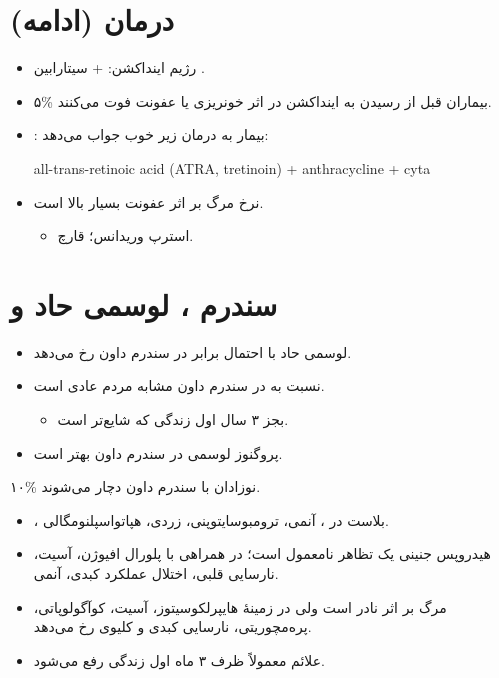 \documentclass[12pt,a4paper]{article}
\begin{document}
\section*{درمان  (ادامه)}
\begin{itemize}
\item رژیم اینداکشن:  + سیتارابین .
\item ۵\% بیماران قبل از رسیدن به اینداکشن در اثر خونریزی یا عفونت فوت می‌کنند.
\item {}: بیمار به درمان زیر خوب جواب می‌دهد:
\begin{latin}
\noindent all-trans-retinoic acid (ATRA, tretinoin) + anthracycline + cyta
\end{latin}
\item نرخ مرگ بر اثر عفونت بسیار بالا است.
\begin{itemize}
\item استرپ وریدانس؛ قارچ.
\end{itemize}
\end{itemize}
\section*{سندرم ، لوسمی حاد و }
\begin{itemize}
\item لوسمی حاد با احتمال  برابر در سندرم داون رخ می‌دهد.
\item نسبت  به  در سندرم داون مشابه مردم عادی است.
\begin{itemize}
\item بجز ۳ سال اول زندگی که  شایع‌تر است.
\end{itemize}
\item پروگنوز لوسمی در سندرم داون بهتر است.
\end{itemize}
۱۰\% نوزادان با سندرم داون دچار  می‌شوند.
\begin{itemize}
\item {}، بلاست در ، آنمی، ترومبوسایتوپنی، زردی، هپاتواسپلنومگالی.
\item هیدروپس جنینی یک تظاهر نامعمول  است؛ در همراهی با پلورال افیوژن، آسیت، نارسایی قلبی، اختلال عملکرد کبدی، آنمی.
\item مرگ بر اثر  نادر است ولی در زمینهٔ هایپرلکوسیتوز، آسیت، کوآگولوپاتی، پره‌مچوریتی، نارسایی کبدی و کلیوی رخ می‌دهد.
\item علائم معمولاً ظرف ۳ ماه اول زندگی رفع می‌شود.
\end{itemize}
\end{document}
